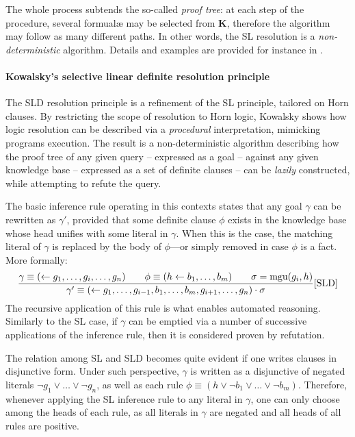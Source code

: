 \documentclass[12pt,a4paper,openright,twoside]{book}
\begin{document}
The whole process subtends the so-called \emph{proof tree}: at each step of the procedure, several formual\ae{} may be selected from $\mathbf{K}$, therefore the algorithm may follow as many different paths.
%
In other words, the SL resolution is a \emph{non-deterministic} algorithm.
%
Details and examples are provided for instance in \cite{CureRdf2015}.

\paragraph{Kowalsky's selective linear definite resolution principle}

The SLD resolution principle \cite{Kowalski1976} is a refinement of the SL principle, tailored on Horn clauses.
%
By restricting the scope of resolution to Horn logic, Kowalsky shows how logic resolution can be described via a \emph{procedural} interpretation, mimicking programs execution.
%
The result is a non-deterministic algorithm describing how the proof tree of any given query -- expressed as a goal -- against any given knowledge base -- expressed as a set of definite clauses -- can be \emph{lazily} constructed, while attempting to refute the query.

The basic inference rule operating in this contexts states that any goal $\gamma$ can be rewritten as $\gamma'$, provided that some definite clause $\phi$ exists in the knowledge base whose head unifies with some literal in $\gamma$.
%
When this is the case, the matching literal of $\gamma$ is replaced by the body of $\phi$---or simply removed in case $\phi$ is a fact.
%
More formally:
%
\begin{equation*}
    \frac{
        \gamma \equiv (\leftarrow g_1, \ldots, g_i, \ldots, g_n)
        \qquad
        \phi \equiv (h \leftarrow b_1, \ldots, b_m)
        \qquad
        \sigma = \text{mgu}(g_i, h)
    }{
        \gamma' \equiv (\leftarrow g_1, \ldots, g_{i-1}, b_1, \ldots, b_m, g_{i+1}, \ldots, g_n) \cdot \sigma
    }[\text{SLD}]
\end{equation*}
%
The recursive application of this rule is what enables automated reasoning.
%
Similarly to the SL case, if $\gamma$ can be emptied via a number of successive applications of the inference rule, then it is considered proven by refutation.

The relation among SL and SLD becomes quite evident if one writes clauses in disjunctive form.
%
Under such perspective, $\gamma$ is written as a disjunctive of negated literals $\lnot g_1 \vee \ldots \vee \lnot g_n$, as well as each rule $\phi \equiv (h \vee \lnot b_1 \vee \ldots \vee \lnot b_m)$.
%
Therefore, whenever applying the SL inference rule to any literal in $\gamma$, one can only choose among the heads of each rule, as all literals in $\gamma$ are negated and all heads of all rules are positive.
\end{document}
